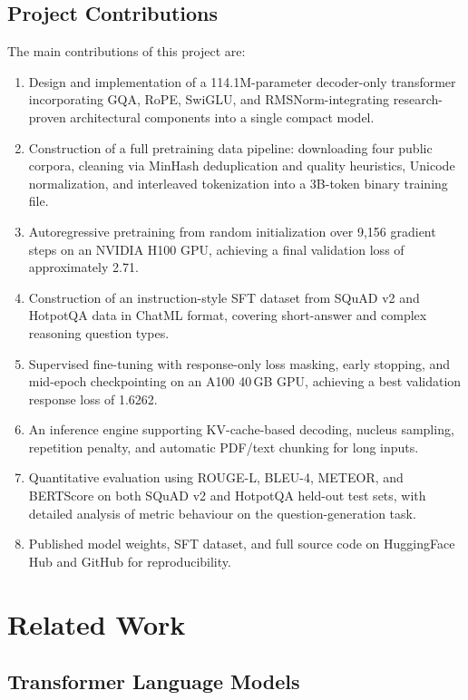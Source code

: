 \documentclass[12pt]{article}
\begin{document}
\subsection{Project Contributions}

The main contributions of this project are:
\begin{enumerate}[leftmargin=1.2cm]
  \item Design and implementation of a 114.1M-parameter decoder-only transformer incorporating GQA, RoPE, SwiGLU, and RMSNorm-integrating research-proven architectural components into a single compact model.
  \item Construction of a full pretraining data pipeline: downloading four public corpora, cleaning via MinHash deduplication and quality heuristics, Unicode normalization, and interleaved tokenization into a 3B-token binary training file.
  \item Autoregressive pretraining from random initialization over 9,156 gradient steps on an NVIDIA H100 GPU, achieving a final validation loss of approximately 2.71.
  \item Construction of an instruction-style SFT dataset from SQuAD v2 and HotpotQA data in ChatML format, covering short-answer and complex reasoning question types.
  \item Supervised fine-tuning with response-only loss masking, early stopping, and mid-epoch checkpointing on an A100 40\,GB GPU, achieving a best validation response loss of 1.6262.
  \item An inference engine supporting KV-cache-based decoding, nucleus sampling, repetition penalty, and automatic PDF/text chunking for long inputs.
  \item Quantitative evaluation using ROUGE-L, BLEU-4, METEOR, and BERTScore on both SQuAD v2 and HotpotQA held-out test sets, with detailed analysis of metric behaviour on the question-generation task.
  \item Published model weights, SFT dataset, and full source code on HuggingFace Hub and GitHub for reproducibility.
\end{enumerate}

\section{Related Work}

\subsection{Transformer Language Models}
\end{document}
